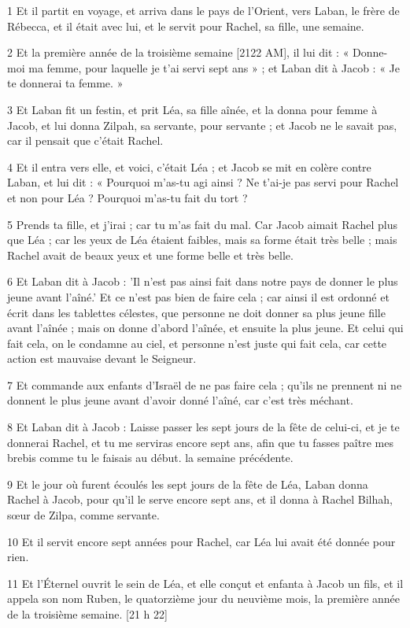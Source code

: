 \par 1 Et il partit en voyage, et arriva dans le pays de l'Orient, vers Laban, le frère de Rébecca, et il était avec lui, et le servit pour Rachel, sa fille, une semaine.
\par 2 Et la première année de la troisième semaine [2122 AM], il lui dit : « Donne-moi ma femme, pour laquelle je t'ai servi sept ans » ; et Laban dit à Jacob : « Je te donnerai ta femme. »
\par 3 Et Laban fit un festin, et prit Léa, sa fille aînée, et la donna pour femme à Jacob, et lui donna Zilpah, sa servante, pour servante ; et Jacob ne le savait pas, car il pensait que c'était Rachel.
\par 4 Et il entra vers elle, et voici, c'était Léa ; et Jacob se mit en colère contre Laban, et lui dit : « Pourquoi m'as-tu agi ainsi ? Ne t'ai-je pas servi pour Rachel et non pour Léa ? Pourquoi m'as-tu fait du tort ?
\par 5 Prends ta fille, et j'irai ; car tu m'as fait du mal. Car Jacob aimait Rachel plus que Léa ; car les yeux de Léa étaient faibles, mais sa forme était très belle ; mais Rachel avait de beaux yeux et une forme belle et très belle.
\par 6 Et Laban dit à Jacob : 'Il n'est pas ainsi fait dans notre pays de donner le plus jeune avant l'aîné.' Et ce n’est pas bien de faire cela ; car ainsi il est ordonné et écrit dans les tablettes célestes, que personne ne doit donner sa plus jeune fille avant l'aînée ; mais on donne d'abord l'aînée, et ensuite la plus jeune. Et celui qui fait cela, on le condamne au ciel, et personne n'est juste qui fait cela, car cette action est mauvaise devant le Seigneur.
\par 7 Et commande aux enfants d'Israël de ne pas faire cela ; qu'ils ne prennent ni ne donnent le plus jeune avant d'avoir donné l'aîné, car c'est très méchant.
\par 8 Et Laban dit à Jacob : Laisse passer les sept jours de la fête de celui-ci, et je te donnerai Rachel, et tu me serviras encore sept ans, afin que tu fasses paître mes brebis comme tu le faisais au début. la semaine précédente.
\par 9 Et le jour où furent écoulés les sept jours de la fête de Léa, Laban donna Rachel à Jacob, pour qu'il le serve encore sept ans, et il donna à Rachel Bilhah, sœur de Zilpa, comme servante.
\par 10 Et il servit encore sept années pour Rachel, car Léa lui avait été donnée pour rien.
\par 11 Et l'Éternel ouvrit le sein de Léa, et elle conçut et enfanta à Jacob un fils, et il appela son nom Ruben, le quatorzième jour du neuvième mois, la première année de la troisième semaine. [21 h 22]
